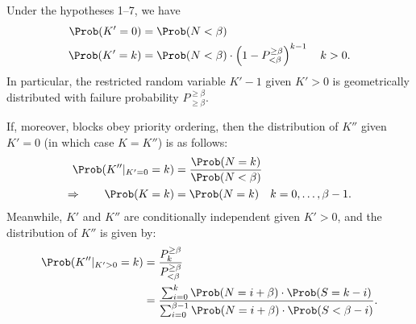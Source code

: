 \documentclass[a4paper,11pt]{article}
\begin{document}
\begin{proposition}
\label{message-number-distribution}

  Under the hypotheses 1--7, we have
  \begin{align}
    \Prob(K'=0) &= \Prob(N< \beta) \\
    \Prob(K'=k) &= \Prob(N<\beta)\cdot \left(1-P^{\geq\beta}_{<\beta}\right)^{k-1}\quad k>0.
  \end{align}
  In particular, the restricted random variable $K'-1$ given ${K'>0}$ is geometrically distributed with failure probability $P^{\geq\beta}_{\geq\beta}$.
  
  If, moreover, blocks obey priority ordering, then the distribution of $K''$ given $K'=0$ (in which case $K=K''$) is as follows:
  \begin{align}
    \Prob(K''|_{K'=0}= k) &= \frac{\Prob(N=k)}{\Prob(N<\beta)}  \label{K''-dist-0} \\
   \Rightarrow \qquad \Prob(K=k) &= \Prob(N=k) \quad k=0,\ldots,\beta-1.
  \end{align}
  Meanwhile, $K'$ and $K''$ are conditionally independent given $K'>0$, and the distribution of $K''$ is given by:
  \begin{align}
    \Prob(K''|_{K'>0}= k) &= \frac{P^{\geq\beta}_k}{P^{\geq\beta}_{<\beta}}  \\
    &= \frac{\sum_{i=0}^{k} \Prob(N=i+\beta)\cdot \Prob(S=k-i)} 
      {\sum_{i=0}^{\beta-1} \Prob(N=i+\beta)\cdot \Prob(S<\beta-i)}.
  \end{align}
\end{proposition}
%
\end{document}
